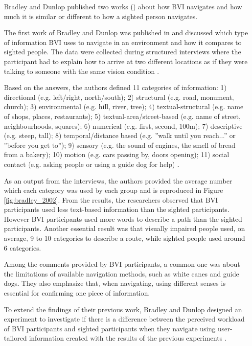 Bradley and Dunlop published two works (\citeyear{bradley2002investigating,bradley2005experimental}) about how BVI navigates and how much it is similar or different to how a sighted person navigates. 

The first work of Bradley and Dunlop was published in \citeyear{bradley2002investigating} and discussed which type of information BVI uses to navigate in an environment and how it compares to sighted people. The data were collected during structured interviews where the participant had to explain how to arrive at two different locations as if they were talking to someone with the same vision condition \cite{bradley2002investigating}.

Based on the answers, the authors defined 11 categories of information: 1) directional (e.g. left/right, north/south); 2) structural (e.g. road, monument, church); 3) environmental (e.g. hill, river, tree); 4) textual-structural (e.g. name of shops, places, restaurants); 5) textual-area/street-based (e.g. name of street, neighbourhoods, squares); 6) numerical (e.g. first, second, 100m); 7) descriptive (e.g. steep, tall); 8) temporal/distance based (e.g. ”walk until you reach...” or ”before you get to”); 9) sensory (e.g. the sound of engines, the smell of bread from a bakery); 10) motion (e.g. cars passing by, doors opening); 11) social contact (e.g. asking people or using a guide dog for help) \cite{bradley2002investigating}.

As an output from the interviews, the authors provided the average number which each category was used by each group and is reproduced in Figure \ref{fig:bradley_2002}. From the results, the researchers observed that BVI participants used less text-based information than the sighted participants. However BVI participants used more words to describe a path than the sighted participants. Another essential result was that visually impaired people used, on average, 9 to 10 categories to describe a route, while sighted people used around 6 categories.



Among the comments provided by BVI participants, a common one was about the limitations of available navigation methods, such as white canes and guide dogs. They also emphasize that, when navigating, using different senses is essential for confirming one piece of information. 

To extend the findings of their previous work, Bradley and Dunlop designed an experiment to investigate if there is a difference between the perceived workload of BVI participants and sighted participants when they navigate using user-tailored information created with the results of the previous experiments \cite{bradley2005experimental}.


